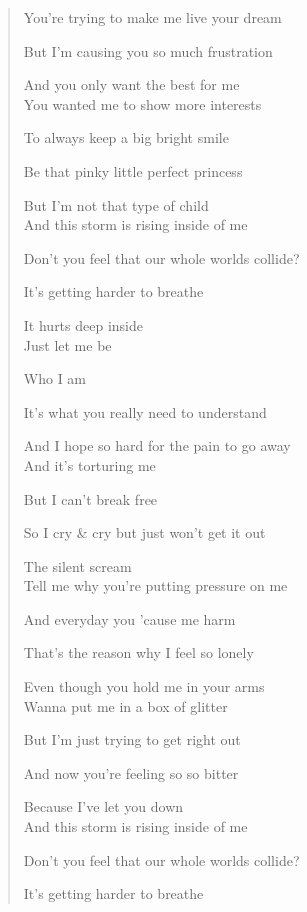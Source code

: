 \documentclass{article}
\begin{document}
\begin{enumerate}
\begin{quotation}
		You're trying to make me live your dream
		
		But I'm causing you so much frustration
		
		And you only want the best for me
		\\
		
		You wanted me to show more interests
		
		To always keep a big bright smile
		
		Be that pinky little perfect princess
		
		But I'm not that type of child
		\\
		
		And this storm is rising inside of me
		
		Don't you feel that our whole worlds collide?
		
		It's getting harder to breathe
		
		It hurts deep inside
		\\
		
		Just let me be
		
		Who I am
		
		It's what you really need to understand
		
		And I hope so hard for the pain to go away
		\\
		
		And it's torturing me
		
		But I can't break free
		
		So I cry \& cry but just won't get it out
		
		The silent scream
		\\
		
		Tell me why you're putting pressure on me
		
		And everyday you 'cause me harm
		
		That's the reason why I feel so lonely
		
		Even though you hold me in your arms
		\\
		
		Wanna put me in a box of glitter
		
		But I'm just trying to get right out
		
		And now you're feeling so so bitter
		
		Because I've let you down
		\\
		
		And this storm is rising inside of me
		
		Don't you feel that our whole worlds collide?
		
		It's getting harder to breathe
		

\end{quotation}
\end{enumerate}
\end{document}
